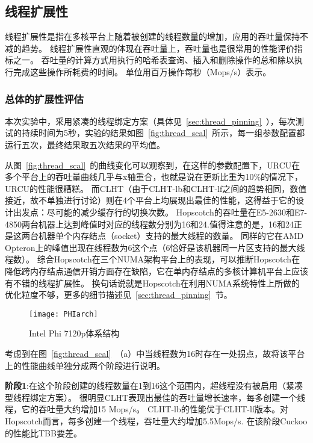 \subsection{线程扩展性}

线程扩展性是指在多核平台上随着被创建的线程数量的增加，应用的吞吐量保持不减的趋势。
线程扩展性直观的体现在吞吐量上，吞吐量也是很常用的性能评价指标之一。
吞吐量的计算方式用执行的哈希表查询、插入和删除操作的总和除以执行完成这些操作所耗费的时间。
单位用百万操作每秒（Mops/s）表示。

\label{sec:thread_scal}
\subsubsection{总体的扩展性评估}

本次实验中，采用紧凑的线程绑定方案（具体见~\ref{sec:thread_pinning}~），每次测试的持续时间为5秒，实验的结果如图~\ref{fig:thread_scal}~所示，每一组参数配置都运行五次，最终结果取五次结果的平均值。

从图~\ref{fig:thread_scal}~的曲线变化可以观察到，在这样的参数配置下，URCU在多个平台上的吞吐量曲线几乎与x轴重合，也就是说在更新比重为10\%的情况下，URCU的性能很糟糕。
而CLHT（由于CLHT-lb和CLHT-lf之间的趋势相同，数值接近，故不单独进行讨论）则在4个平台上均展现出最佳的性能，这得益于它的设计出发点：尽可能的减少缓存行的切换次数。
Hopscotch的吞吐量在E5-2630和E7-4850两台机器上达到峰值时对应的线程数分别为16和24.值得注意的是，16和24正是这两台机器单个内存结点（socket）支持的最大线程的数量。
同样的它在AMD Opteron上的峰值出现在线程数为6这个点（6恰好是该机器同一片区支持的最大线程数）。
综合Hopscotch在三个NUMA架构平台上的表现，可以推断Hopscotch在降低跨内存结点通信开销方面存在缺陷，它在单内存结点的多核计算机平台上应该有不错的线程扩展性。
换句话说就是Hopscotch在利用NUMA系统特性上所做的优化粒度不够，更多的细节描述见~\ref{sec:thread_pinning}~节。

\begin{figure}[htbp]
\centering
\texttt{[image: PHIarch]}
\caption{Intel Phi 7120p体系结构}\label{fig:phi_arch}
\end{figure}

考虑到在图~\ref{fig:thread_scal}~（a）中当线程数为16时存在一处拐点，故将该平台上的性能曲线单独分成两个阶段进行说明。

\textbf{阶段1}:在这个阶段创建的线程数量在1到16这个范围内，超线程没有被启用（紧凑型线程绑定方案）。
很明显CLHT表现出最佳的吞吐量增长速率，每多创建一个线程，它的吞吐量大约增加15 Mops/s。
CLHT-lb的性能优于CLHT-lf版本。对Hopscotch而言，每多创建一个线程，吞吐量大约增加5.5Mops/s. 在该阶段Cuckoo的性能比TBB要差。

